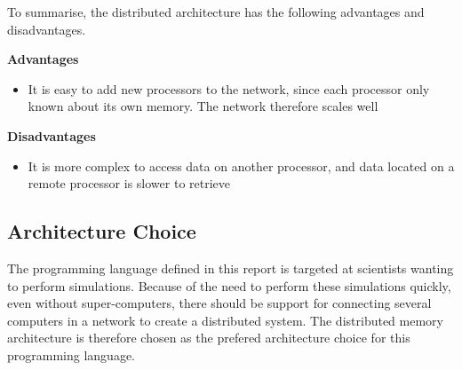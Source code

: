 To summarise, the distributed architecture has the following advantages and disadvantages.

\noindent\textbf{Advantages}
\begin{itemize}
    \item It is easy to add new processors to the network, since each processor only known about its own memory. The network therefore scales well
\end{itemize}

\noindent\textbf{Disadvantages}
\begin{itemize}
    \item It is more complex to access data on another processor, and data located on a remote processor is slower to retrieve
\end{itemize}

\subsection{Architecture Choice}

The programming language defined in this report is targeted at scientists wanting to perform simulations. Because of the need to perform these simulations quickly, even without super-computers, there should be support for connecting several computers in a network to create a distributed system. The distributed memory architecture is therefore chosen as the prefered architecture choice for this programming language.
